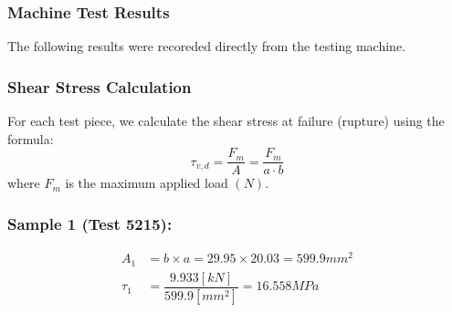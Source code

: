 \subsubsection{Machine Test Results}
\noindent The following results were recoreded directly from the testing machine.
\begin{table}[H]
\caption{Machine test results}
\end{table}
\subsubsection{Shear Stress Calculation}
\noindent For each test piece, we calculate the shear stress at failure (rupture) using the formula:
\[ \tau_{v,d} = \dfrac{F_m}{A} = \dfrac{F_m}{a \cdot b}\]
\noindent where $F_m$ is the maximum applied load $(N)$.
\newpage \subsubsection*{Sample 1 (Test 5215):}
\begin{align*}
A_1 & = b \times a = 29.95 \times 20.03 = 599.9 mm^2  \\
\tau_1 & = \dfrac{9.933 [kN]}{599.9 [mm^2]} =16.558 MPa
\end{align*}

